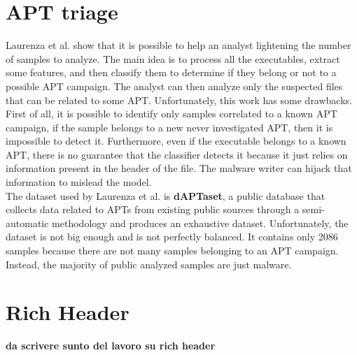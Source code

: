 \section{APT triage}
Laurenza et al. show that it is possible to help an analyst lightening the number of samples to analyze. The main idea is to process all the executables, extract some features, and then classify them to determine if they belong or not to a possible APT campaign. The analyst can then analyze only the suspected files that can be related to some APT. Unfortunately, this work has some drawbacks. First of all, it is possible to identify only samples correlated to a known APT campaign, if the sample belongs to a new never investigated APT, then it is impossible to detect it. Furthermore, even if the executable belongs to a known APT, there is no guarantee that the classifier detects it because it just relies on information present in the header of the file. The malware writer can hijack that information to mislead the model. \\


The dataset used by Laurenza et al. is \textbf{dAPTaset}, a public database that collects data related to APTs from existing public sources through a semi-automatic methodology and produces an exhaustive dataset. Unfortunately, the dataset is not big enough and is not perfectly balanced. It contains only 2086 samples because there are not many samples belonging to an APT campaign. Instead, the majority of public analyzed samples are just malware.

\section{Rich Header}
\textbf{da scrivere sunto del lavoro su rich header}
\cite{dubyk2019sans}
